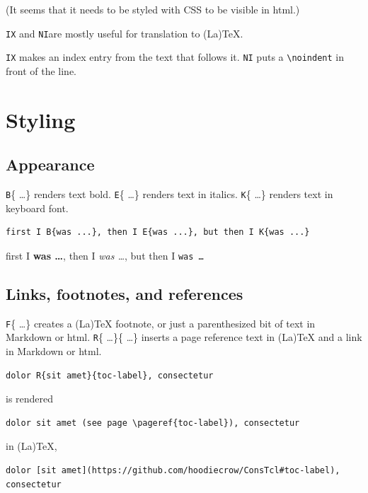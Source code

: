 (It seems that it needs to be styled with CSS to be visible in html.)

\texttt{IX} and \texttt{NI}are mostly useful for translation to (La)TeX.

\texttt{IX} makes an index entry from the text that follows it. \texttt{NI} puts a \texttt{\textbackslash noindent} in front of the line.

\chapter{Styling}
\label{styling}

\section{Appearance}
\label{appearance}

\texttt{B}\{ \ldots  \} renders text bold. \texttt{E}\{ \ldots  \} renders text in italics. \texttt{K}\{ \ldots  \} renders text in keyboard font.

\begin{verbatim}
first I B{was ...}, then I E{was ...}, but then I K{was ...}
\end{verbatim}

first I \textbf{was \ldots }, then I \emph{was \ldots }, but then I \texttt{was \ldots }

\section{Links, footnotes, and references}
\label{links-footnotes-and-references}

\texttt{F}\{ \ldots  \} creates a (La)TeX footnote, or just a parenthesized bit of text in Markdown or html. \texttt{R}\{ \ldots  \}\{ \ldots  \} inserts a page reference text in (La)TeX and a link in Markdown or html.

\begin{verbatim}
dolor R{sit amet}{toc-label}, consectetur
\end{verbatim}

is rendered

\begin{verbatim}
dolor sit amet (see page \pageref{toc-label}), consectetur
\end{verbatim}

in (La)TeX,

\begin{verbatim}
dolor [sit amet](https://github.com/hoodiecrow/ConsTcl#toc-label), consectetur
\end{verbatim}

